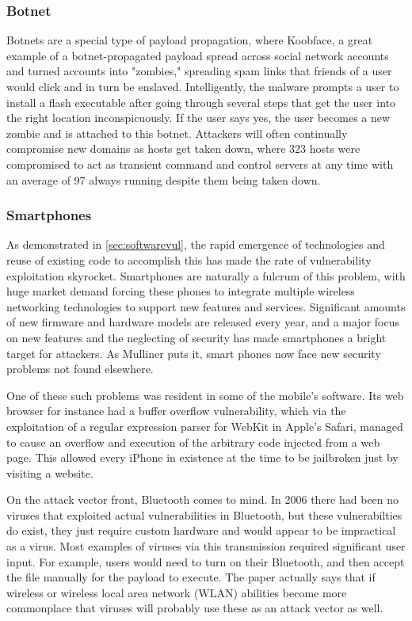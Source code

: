 \documentclass[a4paper, 11pt]{article}
\begin{document}
\subsubsection{Botnet}
\label{sec:botnet}
Botnets are a special type of payload propagation, where Koobface, a great example of a botnet-propagated payload spread across social network accounts and turned accounts into "zombies," spreading spam links that friends of a user would click and in turn be enslaved. \cite{ref:thomas2010koobface} Intelligently, the malware prompts a user to install a flash executable after going through several steps that get the user into the right location inconspicuously. If the user says yes, the user becomes a new zombie and is attached to this botnet. Attackers will often continually compromise new domains as hosts get taken down, where 323 hosts were compromised to act as transient command and control servers at any time with an average of 97 always running despite them being taken down.

\subsubsection{Smartphones}
\label{sec:smartphones}
As demonstrated in \ref{sec:softwarevul}, the rapid emergence of technologies and reuse of existing code to accomplish this has made the rate of vulnerability exploitation skyrocket. \cite{ref:jang2014survey} Smartphones are naturally a fulcrum of this problem, with huge market demand forcing these phones to integrate multiple wireless networking technologies to support new features and services. \cite{ref:mulliner2006security} Significant amounts of new firmware and hardware models are released every year, and a major focus on new features and the neglecting of security has made smartphones a bright target for attackers. \cite{ref:mulliner2006security} As Mulliner \cite{ref:mulliner2006security} puts it, smart phones now face new security problems not found elsewhere.

One of these such problems was resident in some of the mobile's software. Its web browser for instance had a buffer overflow vulnerability, which via the exploitation of a regular expression parser for WebKit in Apple's Safari, managed to cause an overflow and execution of the arbitrary code injected from a web page. \cite{ref:dunham2008mobile} This allowed every iPhone in existence at the time to be jailbroken just by visiting a website.

On the attack vector front, Bluetooth comes to mind. In 2006 there had been no viruses that exploited actual vulnerabilities in Bluetooth, but these vulnerabilties do exist, they just require custom hardware and would appear to be impractical as a virus. \cite{ref:toyssy2006malicious} Most examples of viruses via this transmission required significant user input. For example, users would need to turn on their Bluetooth, and then accept the file manually for the payload to execute. The paper actually says that if wireless or wireless local area network (WLAN) abilities become more commonplace that viruses will probably use these as an attack vector as well.
\end{document}
